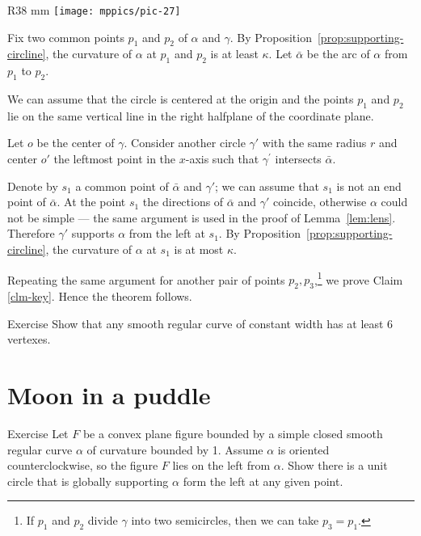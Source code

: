 \begin{wrapfigure}{R}{38 mm}
\vskip-0mm
\centering
\texttt{[image: mppics/pic-27]}
\vskip0mm
\end{wrapfigure}
  
Fix two common points $p_1$ and $p_2$ of $\alpha$ and $\gamma$.
By Proposition~\ref{prop:supporting-circline}, the curvature of $\alpha$ at $p_1$ and $p_2$ is at least $\kappa$.
Let $\bar\alpha$ be the arc of $\alpha$ from $p_1$ to $p_2$.

We can assume that the circle is centered at the origin 
and the points $p_1$ and $p_2$ lie on the same vertical line in the right halfplane of the coordinate plane.

Let $o$ be the center of $\gamma$.
Consider another circle $\gamma'$ with the same radius $r$ and center $o'$ the leftmost point in the $x$-axis such that $\gamma^{\prime}$ intersects $\bar\alpha$.

Denote by $s_1$ a common point of $\bar\alpha$ and $\gamma'$;
we can assume that $s_1$ is not an end point of $\bar\alpha$.
At the point $s_1$ the directions of $\bar\alpha$ and $\gamma'$ coincide,
otherwise $\alpha$ could not be simple --- the same argument is used in the proof of Lemma~\ref{lem:lens}.
Therefore $\gamma'$ supports $\alpha$ from the left at $s_1$.
By Proposition~\ref{prop:supporting-circline}, the curvature of $\alpha$ at $s_1$ is at most $\kappa$.

Repeating the same argument for another pair of points $p_2,p_3$,\footnote{If $p_1$ and $p_2$ divide $\gamma$ into two semicircles, then we can take $p_3=p_1$.} 
we prove Claim \ref{clm-key}.
Hence the theorem follows.
\qeds

\begin{thm}{Exercise}
Show that any smooth regular curve of constant width has at least 6 vertexes.
\end{thm}

\section{Moon in a puddle}

\begin{thm}{Exercise}\label{ex:moon}
Let $F$ be a convex plane figure bounded by a simple closed smooth regular curve $\alpha$ of curvature bounded by 1.
Assume $\alpha$ is oriented counterclockwise, so the figure $F$ lies on the left from $\alpha$.
Show there is a unit circle that is globally supporting $\alpha$ form the left at any given point.
\end{thm}

